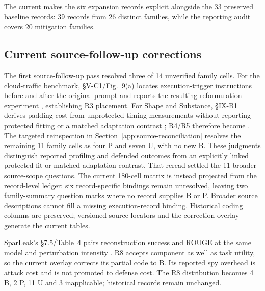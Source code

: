 The current  makes the six expansion records explicit alongside the 33 preserved baseline records: 39 records from 26 distinct families, while the reporting audit covers 20 mitigation families.

\subsection{Current source-follow-up corrections}
The first source-follow-up pass resolved three of 14 unverified family cells. For the cloud-traffic benchmark, \S V-C1/Fig.~9(a) locates execution-trigger instructions before and after the original prompt and reports the resulting reformulation experiment \cite{pouryousef2026traffic}, establishing R3 placement. For Shape and Substance, \S IX-B1 derives padding cost from unprotected timing measurements without reporting protected fitting or a matched adaptation contrast \cite{hadad2026shape}; R4/R5 therefore become \NRR{}. The targeted reinspection in Section~\ref{app:source-reconciliation} resolves the remaining 11 family cells as four P and seven U, with no new B. These judgments distinguish reported profiling and defended outcomes from an explicitly linked protected fit or matched adaptation contrast. That reread settled the 11 broader source-scope questions. The current 180-cell matrix is instead projected from the record-level ledger: six record-specific bindings remain unresolved, leaving two family-summary question marks where no record supplies B or P. Broader source descriptions cannot fill a missing execution-record binding. Historical coding columns are preserved; versioned source locators and the correction overlay generate the current tables.

SparLeak's \S7.5/Table~4 pairs reconstruction success and ROUGE at the same model and perturbation intensity \cite{chen2026sparleak}. R8 accepts component as well as task utility, so the current overlay corrects its partial code to B. Its reported spy overhead is attack cost and is not promoted to defense cost. The R8 distribution becomes 4 B, 2 P, 11 U and 3 inapplicable; historical records remain unchanged.

